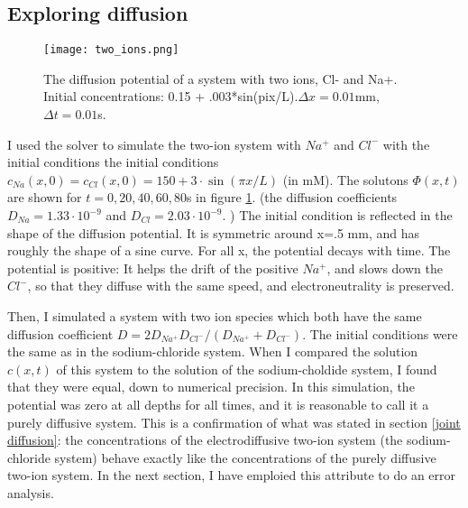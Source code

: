 \documentclass{article}
\begin{document}
\subsection{Exploring diffusion} \label{exploring diffusion}

\begin{figure}
  \texttt{[image: two\_ions.png]}
  \caption{The diffusion potential of a system with two ions, Cl- and Na+. Initial concentrations: 0.15 + .003*sin(pix/L).$\Delta x = 0.01$mm, $\Delta t = 0.01 $s. }
  \label{fig:two_ions}
\end{figure}

I used the solver to simulate the two-ion system with $Na^+$ and $Cl^-$ with the initial conditions the initial conditions $c_{Na}(x,0)=c_{Cl}(x,0)=150+3\cdot \sin(\pi x/L)$ (in mM). The solutons $\Phi(x,t)$ are shown for $t= 0,20,40,60,80$s in figure \ref{fig:two_ions}. (the diffusion coefficients $D_{Na} = 1.33\cdot 10^{-9}$  and $D_{Cl} = 2.03\cdot 10^{-9}$. ) The initial condition is reflected in the shape of the diffusion potential. It is symmetric around x=.5 mm, and has roughly the shape of a sine curve. For all x, the potential decays with time. The potential is positive: It helps the drift of the positive $Na^+$, and slows down the $Cl^-$, so that they diffuse with the same speed, and electroneutrality is preserved.

Then, I simulated a system with two ion species which both have the same diffusion coefficient $D=2D_{Na^+}D_{Cl^-}/(D_{Na^+}+D_{Cl^-})$. The initial conditions were the same as in the sodium-chloride system. When I compared the solution $c(x,t)$ of this system to the solution of the sodium-choldide system, I found that they were equal, down to numerical precision. In this simulation, the potential was zero at all depths for all times, and it is reasonable to call it a purely diffusive system. This is a confirmation of what was stated in section \ref{joint diffusion}: the concentrations of the electrodiffusive two-ion system (the sodium-chloride system) behave exactly like the concentrations of the purely diffusive two-ion system. In the next section, I have emploied this attribute to do an error analysis. 
\end{document}
